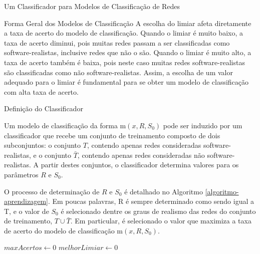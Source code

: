 \begin{section}{Um Classificador para Modelos de Classificação de Redes}
\begin{subsection}{Forma Geral dos Modelos de Classificação}
	A escolha do limiar afeta diretamente a taxa de acerto do modelo de classificação. Quando o limiar é muito baixo, a taxa de acerto diminui, pois muitas redes passam a ser classificadas como software-realistas, inclusive redes que não o são. Quando o limiar é muito alto, a taxa de acerto também é baixa, pois neste caso muitas redes software-realistas são classificadas como não software-realistas. Assim, a escolha de um valor adequado para o limiar é fundamental para se obter um modelo de classificação com alta taxa de acerto.

\end{subsection}

\begin{subsection}{Definição do Classificador}

	Um modelo de classificação da forma $\mathrm{m}(x, R, S_0)$ pode ser induzido por um classificador que recebe um conjunto de treinamento composto de dois subconjuntos: o conjunto $T$, contendo apenas redes consideradas software-realistas, e o conjunto $\bar{T}$, contendo apenas redes consideradas não software-realistas. A partir destes conjuntos, o classificador determina valores para os parâmetros $R$ e $S_0$. 
	
	O processo de determinação de $R$ e $S_0$ é detalhado no Algoritmo \ref{algoritmo-aprendizagem}. Em poucas palavras, R é sempre determinado como sendo igual a T, e o valor de $S_0$ é selecionado dentre os graus de realismo das redes do conjunto de treinamento, $T \cup \bar{T}$. Em particular, é selecionado o valor que maximiza a taxa de acerto do modelo de classificação $\mathrm{m}(x, R, S_0)$.
	

	
\begin{algorithm}
\caption{Algoritmo que determina os parâmetros $R$ e $S_0$ de um modelo de classificação da forma $\mbox{m}(x, R, S_0)$ a partir dos conjuntos $T$ e $\bar{T}$} \label{algoritmo-aprendizagem}
\begin{algorithmic}
\STATE $maxAcertos \gets 0$
\STATE $melhorLimiar \gets 0$


\end{algorithmic}
\end{algorithm}
\end{subsection}
\end{section}
